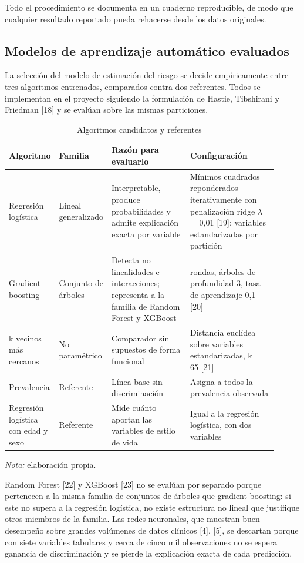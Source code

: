 \documentclass[conference]{IEEEtran}
\begin{document}
Todo el procedimiento se documenta en un cuaderno reproducible, de modo que cualquier resultado reportado pueda rehacerse desde los datos originales.

\subsection{Modelos de aprendizaje automático evaluados}
La selección del modelo de estimación del riesgo se decide empíricamente entre tres algoritmos entrenados, comparados contra dos referentes. Todos se implementan en el proyecto siguiendo la formulación de Hastie, Tibshirani y Friedman [18] y se evalúan sobre las mismas particiones.

\begin{table}[!t]
\centering
\caption{Algoritmos candidatos y referentes}
\footnotesize
\renewcommand{\arraystretch}{1.15}
\begin{tabular}{>{\raggedright\arraybackslash}p{0.110\linewidth}>{\raggedright\arraybackslash}p{0.110\linewidth}>{\raggedright\arraybackslash}p{0.325\linewidth}>{\raggedright\arraybackslash}p{0.367\linewidth}}
\hline
\textbf{Algoritmo} & \textbf{Familia} & \textbf{Razón para evaluarlo} & \textbf{Configuración} \\ \hline
Regresión logística & Lineal generalizado & Interpretable, produce probabilidades y admite explicación exacta por variable & Mínimos cuadrados reponderados iterativamente con penalización ridge $\lambda$ = 0{,}01 [19]; variables estandarizadas por partición \\ \hline
Gradient boosting & Conjunto de árboles & Detecta no linealidades e interacciones; representa a la familia de Random Forest y XGBoost & 100 rondas, árboles de profundidad 3, tasa de aprendizaje 0{,}1 [20] \\ \hline
k vecinos más cercanos & No paramétrico & Comparador sin supuestos de forma funcional & Distancia euclídea sobre variables estandarizadas, k = 65 [21] \\ \hline
Prevalencia & Referente & Línea base sin discriminación & Asigna a todos la prevalencia observada \\ \hline
Regresión logística con edad y sexo & Referente & Mide cuánto aportan las variables de estilo de vida & Igual a la regresión logística, con dos variables \\ \hline
\end{tabular}
\par\smallskip\parbox{\linewidth}{\scriptsize\textit{Nota:} elaboración propia.}
\end{table}
Random Forest [22] y XGBoost [23] no se evalúan por separado porque pertenecen a la misma familia de conjuntos de árboles que gradient boosting: si este no supera a la regresión logística, no existe estructura no lineal que justifique otros miembros de la familia. Las redes neuronales, que muestran buen desempeño sobre grandes volúmenes de datos clínicos [4], [5], se descartan porque con siete variables tabulares y cerca de cinco mil observaciones no se espera ganancia de discriminación y se pierde la explicación exacta de cada predicción.
\end{document}
